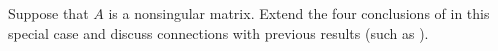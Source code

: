 Suppose that $A$ is a nonsingular matrix.  Extend the four conclusions of  in this special case and discuss connections with previous results (such as ).